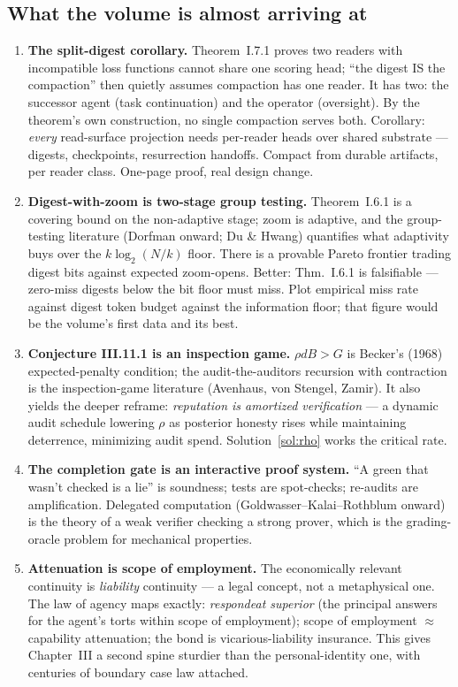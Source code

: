 \documentclass[11pt,a4paper]{article}
\theoremstyle{definition}
\theoremstyle{remark}
\begin{document}
\subsection{What the volume is almost arriving at}
\begin{enumerate}[leftmargin=1.4em,itemsep=2pt]
\item \textbf{The split-digest corollary.} Theorem~I.7.1 proves two readers with incompatible loss functions cannot share one scoring head; ``the digest IS the compaction'' then quietly assumes compaction has one reader. It has two: the successor agent (task continuation) and the operator (oversight). By the theorem's own construction, no single compaction serves both. Corollary: \emph{every} read-surface projection needs per-reader heads over shared substrate --- digests, checkpoints, resurrection handoffs. Compact from durable artifacts, per reader class. One-page proof, real design change.
\item \textbf{Digest-with-zoom is two-stage group testing.} Theorem~I.6.1 is a covering bound on the non-adaptive stage; zoom is adaptive, and the group-testing literature (Dorfman onward; Du \& Hwang) quantifies what adaptivity buys over the $k\log_2(N/k)$ floor. There is a provable Pareto frontier trading digest bits against expected zoom-opens. Better: Thm.~I.6.1 is falsifiable --- zero-miss digests below the bit floor must miss. Plot empirical miss rate against digest token budget against the information floor; that figure would be the volume's first data and its best.
\item \textbf{Conjecture III.11.1 is an inspection game.} $\rho d B > G$ is Becker's (1968) expected-penalty condition; the audit-the-auditors recursion with contraction is the inspection-game literature (Avenhaus, von Stengel, Zamir). It also yields the deeper reframe: \emph{reputation is amortized verification} --- a dynamic audit schedule lowering $\rho$ as posterior honesty rises while maintaining deterrence, minimizing audit spend. Solution~\ref{sol:rho} works the critical rate.
\item \textbf{The completion gate is an interactive proof system.} ``A green that wasn't checked is a lie'' is soundness; tests are spot-checks; re-audits are amplification. Delegated computation (Goldwasser--Kalai--Rothblum onward) is the theory of a weak verifier checking a strong prover, which is the grading-oracle problem for mechanical properties.
\item \textbf{Attenuation is scope of employment.} The economically relevant continuity is \emph{liability} continuity --- a legal concept, not a metaphysical one. The law of agency maps exactly: \emph{respondeat superior} (the principal answers for the agent's torts within scope of employment); scope of employment $\approx$ capability attenuation; the bond is vicarious-liability insurance. This gives Chapter~III a second spine sturdier than the personal-identity one, with centuries of boundary case law attached.
\end{enumerate}
\end{document}
